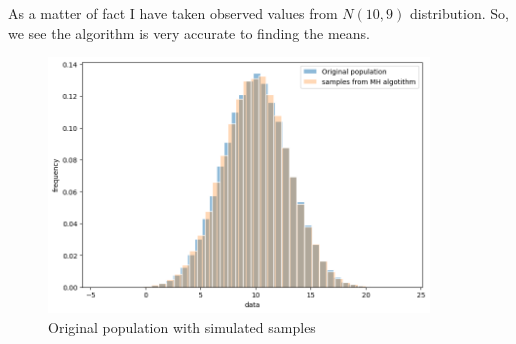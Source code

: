 \begin{example}
    As a matter of fact I have taken observed values from $ N(10,9) $ distribution. So, we see the algorithm is very accurate to finding the means.

    \begin{figure}[H]
        \centering
        \includegraphics[width=0.9\textwidth]{images/metropolis/example2-original-with-simulated.png}
        \caption{Original population with simulated samples}
    \end{figure}

\end{example}







